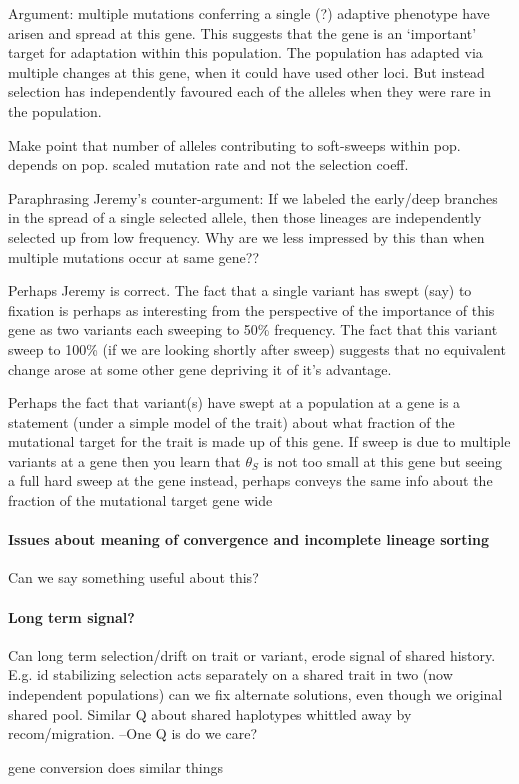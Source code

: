 \documentclass[a4paper,10pt]{article}
\begin{document}
Argument: multiple mutations conferring a single (?) adaptive
phenotype have arisen and spread at this gene. This suggests that the
gene is an `important' target for adaptation within this
population. The population has adapted via multiple changes at this
gene, when it could have used other loci. But instead selection has
independently favoured each of the alleles when they were rare in the population.

Make point that number of alleles contributing to soft-sweeps within
pop. depends on pop. scaled mutation rate and not the selection coeff.

Paraphrasing Jeremy's counter-argument: If we labeled the early/deep branches in the
spread of a single selected allele, then those lineages are
independently selected up from low frequency. Why are we less impressed by
this than when multiple mutations occur at same gene?? 

Perhaps Jeremy is correct. The fact that a single variant has swept
(say) to fixation is perhaps as interesting from the perspective of the
importance of this gene as two variants each sweeping to 50\%
frequency.  The fact that this variant sweep to 100\% (if we are
looking shortly after sweep) suggests that no equivalent change arose
at some other gene depriving it of it's advantage.

Perhaps the fact that variant(s) have swept at a population at a gene
is a statement (under a simple model of the trait) about what fraction
of the mutational target for the trait is made up of this gene. 
If sweep is due to multiple variants at a gene then you learn that
$\theta_S$ is not too small at this gene but seeing a full
hard sweep at the gene instead, perhaps conveys the same info about the fraction of the mutational target gene
wide

\paragraph{Issues about meaning of convergence and incomplete lineage sorting} 
Can we say something useful about this?


\paragraph{Long term signal?}
Can long term selection/drift on trait or variant, erode signal of shared
history. E.g. id stabilizing selection acts separately on a shared
trait in two (now independent populations) can we fix alternate
solutions, even though we original shared pool. Similar Q about shared
haplotypes whittled away by recom/migration. 
--One Q is do we care? 


gene conversion does similar things



\end{document}
